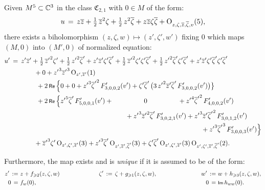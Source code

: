 \documentclass[12pt,twoside,leqno,openany]{amsart}
\begin{document}
\begin{Theorem}
Given $M^5 \subset \mathbb{C}^3$ in the class $\mathfrak{C}_{2,1}$
with $0 \in M$ of the form:
\[
u
\,=\,
z\overline{z}
+
\tfrac{1}{2}\,\overline{z}^2\zeta
+
\tfrac{1}{2}\,z^2\overline{\zeta}
+
z\overline{z}\zeta\overline{\zeta}
+
{\rm O}_{z,\zeta,\overline{z},\overline{\zeta},v}(5),
\]
there exists a biholomorphism $(z,\zeta,w) \longmapsto (z', \zeta',
w')$ fixing $0$ which maps $(M, 0)$ into $(M',0)$ of normalized
equation:
\[
\aligned
u'
&
\,=\,
z'\overline{z}'
+
\tfrac{1}{2}\,{\overline{z}'}^2\zeta'
+
\tfrac{1}{2}\,{z'}^2\overline{\zeta}'
+
z'\overline{z}'\zeta'\overline{\zeta}'
+
\tfrac{1}{2}\,{\overline{z}'}^2\zeta'\zeta'\overline{\zeta}'
+
\tfrac{1}{2}\,{z'}^2\overline{\zeta}'\zeta'\overline{\zeta}'
+
z'\overline{z}'\zeta'\overline{\zeta}'\zeta'\overline{\zeta}'
\notag
\\
&
\ \ \ \ \ \ \ \ \ \ \ 
+
0
+
{z'}^3{\overline{z}'}^3\,
{\rm O}_{z',\overline{z}'}(1)
\notag
\\
&
\ \ \ \ \ \ \ \ \ \ \ \ 
+
2\,\Re\,
\Big\{
0
+
0
+
{z'}^3{\overline{\zeta}'}^2\,
F_{3,0,0,2}'(v')
+
\zeta'\overline{\zeta}'\,
\big(
3\,{z'}^2\overline{z}'\overline{\zeta}'\,
F_{3,0,0,2}'(v')
\big)
\big\}
\notag
\\
&
\ \ \ \ \ \ \ \ \ \ \ \ 
+
2\,\Re\,
\Big\{
{z'}^5\overline{\zeta}'\,
F_{5,0,0,1}'(v')
+
\ \ \ \ \ \ \ \ \ \ \ \ \ \
0
\ \ \ \ \ \ \ \ \ \ \ \ \ \ 
+
{z'}^4{\overline{\zeta}'}^2\,
F_{4,0,0,2}'(v')
\notag
\\
&
\ \ \ \ \ \ \ \ \ \ \ \ \ \ \ \ \ \ \ \ \ \ \ \ \ \ \ \ \ \ \ \ \ \ \ 
\ \ \ \ \ \ \ \ \ \ \ \ \ \ \ \ \ \,
+
{z'}^3{\overline{z}'}^2\overline{\zeta}'\,
F_{3,0,2,1}'(v')
+
{z'}^3\overline{z}'{\overline{\zeta}'}^2\,
F_{3,0,1,2}'(v')
\notag
\\
&
\ \ \ \ \ \ \ \ \ \ \ \ \ \ \ \ \ \ \ \ \ \ \ \ \ \ \ \ \ \ \ \ \ \ \
\ \ \ \ \ \ \ \ \ \ \ \ \ \ \ \ \ \ \ \ \ \ \ \ \ \ \ \ \ \ \ \ \ \ \
\ \ \ \ \ \ \ \ \ \ \ \ \ \ \ \ \
+
{z'}^3{\overline{\zeta}'}^3\,
F_{3,0,0,3}'(v')
\Big\}
\notag
\\
&
\ \ \ \ \ \ \ \ \ \ \ 
+
{\overline{z}'}^3\zeta'\,
{\rm O}_{z',\zeta',\overline{z}'}(3)
+
{z'}^3\overline{\zeta}'\,
{\rm O}_{z',\overline{z}',\overline{\zeta}'}(3)
+
\zeta'\overline{\zeta}'\,
{\rm O}_{z',\zeta',\overline{z}'}(3)\,
{\rm O}_{z',\zeta',\overline{z}',\overline{\zeta}'}(2).
\endaligned
\]

Furthermore, the map exists and is {\em unique} if it is assumed
to be of the form:
\[
\aligned
z'
\,:=\,
&\,
z
+
f_{\geqslant 2}(z,\zeta,w)
\ \ \ \ \ \ \ \ \ \ \ \ \ \ \ \ \ \ \ \
\zeta'
\,:=\,
\zeta
+
g_{\geqslant 1}(z,\zeta,w),
&
\ \ \ \ \ \ \ \ \ \ \ \ \ \ \ \ \ \ \ \
w'
\,:=\,
&\,
w
+
h_{\geqslant 3}(z,\zeta,w),
\\
0
\,=\,
&\,
f_w(0),
&
\ \ \ \ \ \ \ \ \ \ \ \ \ \ \ \ \ \ \ \
0
\,=\,
&\,
\Im\,h_{ww}(0).
\endaligned
\]
\end{Theorem}
\end{document}
